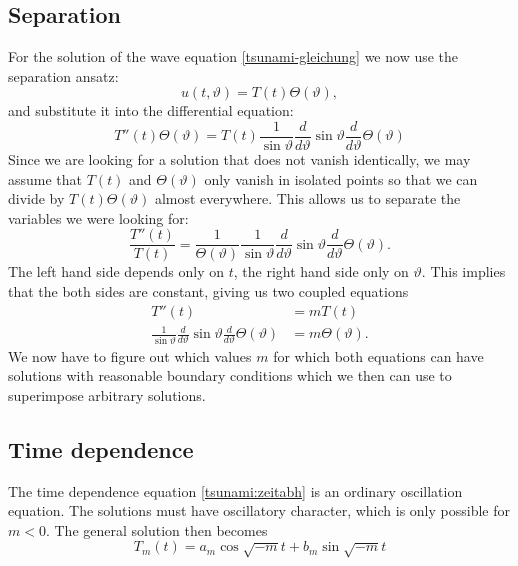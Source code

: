 \subsection{Separation}
For the solution of the wave equation \eqref{tsunami-gleichung}
we now use the separation ansatz:
\[
u(t,\vartheta)=T(t)\Theta(\vartheta),
\]
and substitute it into the differential equation:
\[
T''(t)\Theta(\vartheta)=
T(t)
\frac1{\sin\vartheta}
\frac{d}{d\vartheta}
\sin\vartheta
\frac{d}{d\vartheta}\Theta(\vartheta)
\]
Since we are looking for a solution that does not vanish identically,
we may assume that $T(t)$ and $\Theta(\vartheta)$ only vanish in isolated
points so that we can divide by $T(t)\Theta(\vartheta)$ almost everywhere.
This allows us to separate the variables we were looking for:
\begin{equation}
\frac{T''(t)}{T(t)}
=
\frac1{\Theta(\vartheta)}
\frac1{\sin\vartheta}
\frac{d}{d\vartheta}
\sin\vartheta
\frac{d}{d\vartheta}\Theta(\vartheta).
\label{tsunami-separiert}
\end{equation}
The left hand side depends only on $t$, the right hand side only on
$\vartheta$.
This implies that the both sides are constant, giving us two coupled equations
\begin{align}
T''(t)&=mT(t)
\label{tsunami:zeitabh}
\\
\frac1{\sin\vartheta}
\frac{d}{d\vartheta}
\sin\vartheta
\frac{d}{d\vartheta}\Theta(\vartheta)
&=m\Theta(\vartheta).
\label{tsunami:winkelabh}
\end{align}
We now have to figure out which values $m$ for which both equations
can have solutions with reasonable boundary conditions which we
then can use to superimpose arbitrary solutions.

\subsection{Time dependence}
The time dependence equation \eqref{tsunami:zeitabh} is an ordinary
oscillation equation.
The solutions must have oscillatory character, which is only possible
for $m<0$.
The general solution then becomes
\[
T_m(t)=a_m\cos\sqrt{-m}t+b_m\sin\sqrt{-m}t
\]

